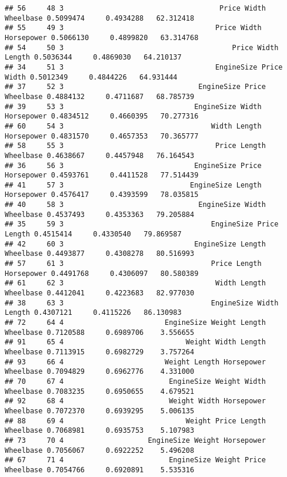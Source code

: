 \documentclass[
]{book}
\begin{document}
\begin{verbatim}
## 56     48 3                                     Price Width Wheelbase 0.5099474     0.4934288   62.312418
## 55     49 3                                    Price Width Horsepower 0.5066130     0.4899820   63.314768
## 54     50 3                                        Price Width Length 0.5036344     0.4869030   64.210137
## 34     51 3                                    EngineSize Price Width 0.5012349     0.4844226   64.931444
## 37     52 3                                EngineSize Price Wheelbase 0.4884132     0.4711687   68.785739
## 39     53 3                               EngineSize Width Horsepower 0.4834512     0.4660395   70.277316
## 60     54 3                                   Width Length Horsepower 0.4831570     0.4657353   70.365777
## 58     55 3                                    Price Length Wheelbase 0.4638667     0.4457948   76.164543
## 36     56 3                               EngineSize Price Horsepower 0.4593761     0.4411528   77.514439
## 41     57 3                              EngineSize Length Horsepower 0.4576417     0.4393599   78.035815
## 40     58 3                                EngineSize Width Wheelbase 0.4537493     0.4353363   79.205884
## 35     59 3                                   EngineSize Price Length 0.4515414     0.4330540   79.869587
## 42     60 3                               EngineSize Length Wheelbase 0.4493877     0.4308278   80.516993
## 57     61 3                                   Price Length Horsepower 0.4491768     0.4306097   80.580389
## 61     62 3                                    Width Length Wheelbase 0.4412041     0.4223683   82.977030
## 38     63 3                                   EngineSize Width Length 0.4307121     0.4115226   86.130983
## 72     64 4                        EngineSize Weight Length Wheelbase 0.7120588     0.6989706    3.556655
## 91     65 4                             Weight Width Length Wheelbase 0.7113915     0.6982729    3.757264
## 93     66 4                        Weight Length Horsepower Wheelbase 0.7094829     0.6962776    4.331000
## 70     67 4                         EngineSize Weight Width Wheelbase 0.7083235     0.6950655    4.679521
## 92     68 4                         Weight Width Horsepower Wheelbase 0.7072370     0.6939295    5.006135
## 88     69 4                             Weight Price Length Wheelbase 0.7068981     0.6935753    5.107983
## 73     70 4                    EngineSize Weight Horsepower Wheelbase 0.7056067     0.6922252    5.496208
## 67     71 4                         EngineSize Weight Price Wheelbase 0.7054766     0.6920891    5.535316

\end{verbatim}
\end{document}
